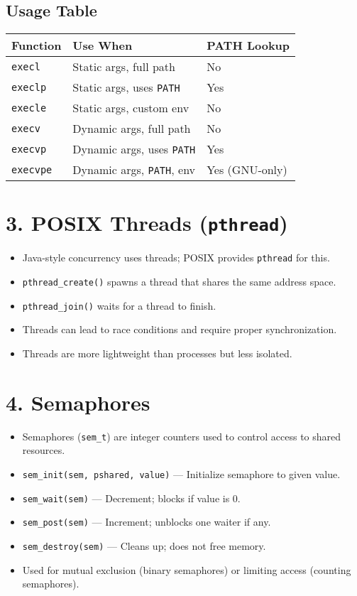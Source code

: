 \documentclass[12pt]{article}
\begin{document}
\subsection*{Usage Table}

\begin{center}
\begin{tabular}{|l|l|l|}
\hline
\textbf{Function} & \textbf{Use When} & \textbf{PATH Lookup} \\
\hline
\texttt{execl}    & Static args, full path     & No  \\
\texttt{execlp}   & Static args, uses \texttt{PATH} & Yes \\
\texttt{execle}   & Static args, custom env    & No  \\
\texttt{execv}    & Dynamic args, full path    & No  \\
\texttt{execvp}   & Dynamic args, uses \texttt{PATH} & Yes \\
\texttt{execvpe}  & Dynamic args, \texttt{PATH}, env & Yes (GNU-only) \\
\hline
\end{tabular}
\end{center}

\section*{3. POSIX Threads (\texttt{pthread})}

\begin{itemize}[leftmargin=2em]
    \item Java-style concurrency uses threads; POSIX provides \texttt{pthread} for this.
    \item \texttt{pthread\_create()} spawns a thread that shares the same address space.
    \item \texttt{pthread\_join()} waits for a thread to finish.
    \item Threads can lead to race conditions and require proper synchronization.
    \item Threads are more lightweight than processes but less isolated.
\end{itemize}

\section*{4. Semaphores}

\begin{itemize}[leftmargin=2em]
    \item Semaphores (\texttt{sem\_t}) are integer counters used to control access to shared resources.
    \item \texttt{sem\_init(sem, pshared, value)} — Initialize semaphore to given value.
    \item \texttt{sem\_wait(sem)} — Decrement; blocks if value is 0.
    \item \texttt{sem\_post(sem)} — Increment; unblocks one waiter if any.
    \item \texttt{sem\_destroy(sem)} — Cleans up; does not free memory.
    \item Used for mutual exclusion (binary semaphores) or limiting access (counting semaphores).
\end{itemize}
\end{document}
